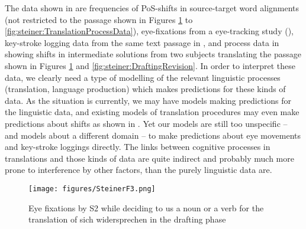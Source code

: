 \documentclass[output=paper]{LSP/langsci}
\begin{document}
\begin{exe}
\begin{exe}
\begin{exe}
\begin{exe}
\begin{exe}
The data shown in  are frequencies of PoS-shifts in source-target word alignments (not restricted to the passage shown in Figures \ref{fig:steiner:EyeFixations} to \ref{fig:steiner:TranslationProcessData}), eye-fixations from a eye-tracking study (), key-stroke logging data from the same text passage in , and process data in  showing shifts in intermediate solutions from two subjects translating the passage shown in Figures \ref{fig:steiner:EyeFixations} and \ref{fig:steiner:DraftingRevision}. In order to interpret these data, we clearly need a type of modelling of the relevant linguistic processes (translation, language production) which makes predictions for these kinds of data. As the situation is currently, we may have models making predictions for the linguistic data, and existing models of translation procedures may even make predictions about shifts as shown in . Yet our models are still too unspecific -- and models about a different domain -- to make predictions about eye movements and key-stroke loggings directly. The links between cognitive processes in translations and those kinds of data are quite indirect and probably much more prone to interference by other factors, than the purely linguistic data are. 

  


\begin{figure}[t]
\texttt{[image: figures/SteinerF3.png]}
\caption{Eye fixations by S2 while deciding to us a noun or a verb for the translation of sich widersprechen in the drafting phase \citep[134]{AlvesEtAl2010}}
\label{fig:steiner:EyeFixations}
\end{figure} 
 

\newcommand{\stern}{{\color{red!90!black}$\bigstar$}}
\newcommand{\raute}{{\color{blue}$\blacklozenge$}}
\newcommand{\xpfeil}{\mbox{\color{blue}$<\hspace*{-.5em}\raisebox{0mm}{$\times$}\hspace*{-1em}\sqsupset$}} 
\newcommand{\lpfeil}{{\color{blue}\textleftarrow}}
\newcommand{\rpfeil}{{\color{blue}\textrightarrow}}
\newcommand{\Rpfeil}{{\color{blue}$\Rightarrow$}}
\newcommand{\maus}{$\bigcap$}



\end{exe}
\end{exe}
\end{exe}
\end{exe}
\end{exe}
\end{document}
